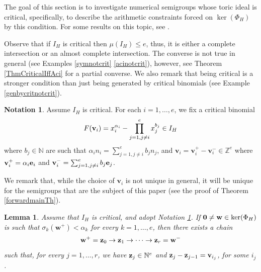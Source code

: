 \documentclass[11pt,twoside]{amsart}
\newcommand{\Z}{\mathbb Z}
\newcommand{\N}{\mathbb N}
\def\bv{{\mathbf v}}
\def\bw{{\mathbf w}}
\def\al{\alpha}
\newtheorem{lem}[Theorem]{Lemma}
\theoremstyle{definition}
\newtheorem{note}[Theorem]{Notation}
\numberwithin{equation}{section}
\begin{document}
The goal of this section is to investigate numerical semigroups whose toric ideal is critical, specifically, to describe the arithmetic constraints forced on $\ker(\Phi_H)$ by this condition.
For some results on this topic, see \cite{AV,KO,GLO}.


Observe that if $I_H$ is critical then $\mu(I_H) \leq e$, thus, it is either a complete intersection or  an almost complete intersection.
The converse is not true in general (see Examples \ref{symnotcrit} \ref{acinotcrit}), however, see Theorem \ref{ThmCriticalIffAci} for a partial converse.
We also remark that being critical is a stronger condition than just being generated by critical binomials (see Example \ref{genbycritnotcrit}).

\begin{note}\label{NotationCritical}
Assume $I_H$ is critical. For each $i= 1, \ldots, e$, we fix a critical binomial
$$ 
F({\bf v}_i)=
x_i^{\al_i} - \prod_{j=1, j\ne i}^e x_j^{b_j} \in I_H
$$
where $b_j \in \N$ are such that $\al_in_i = \sum_{j=1, j\ne i}^e b_jn_j$,
and
 $\bv_i = \bv_i^+-\bv_i^- \in \Z^e$  where  ${\bf v}_i^+ = \al_i{\bf e}_i$ and 
${\bf v}_i^- = \sum_{j=1, j\ne i}^e b_j{\bf e}_j$.
\end{note}

We remark that, while the choice of $\bv_i$ is not unique in general, 
it will be unique for the semigroups that are the subject of this paper (see the proof of Theorem \ref{forwardmainTh}).


\begin{lem}\label{LemChainSum}
Assume that $I_H$ is critical, and adopt Notation \ref{NotationCritical}.
If ${\bf 0} \ne\bw \in \ker(\Phi_H)$ is  such that $\sigma_k(\bw^+) < \alpha_k$ for every $k=1,\ldots,e$, 
then there exists a chain 
$$\bw^+ = {\bf z}_0 \rightarrow {\bf z}_1 \rightarrow \cdots \rightarrow {\bf z}_r = \bw^-$$
such that, for every $j=1,\ldots,r$, we have ${\bf z}_j \in \N^e$ and ${\bf z}_j - {\bf z}_{j-1}=  \bv_{i_j}$, for some $i_j$. 
\end{lem}
\end{document}
